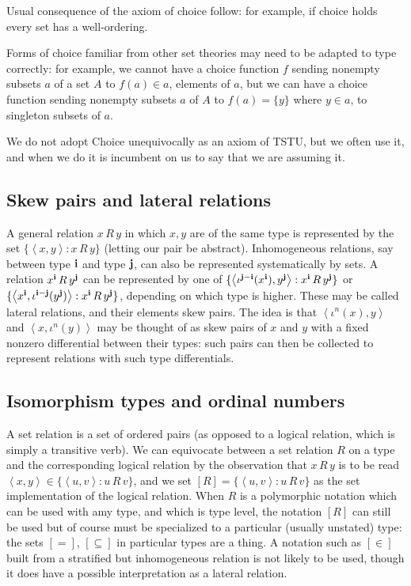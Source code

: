 \documentclass[12pt]{article}
\begin{document}
Usual consequence of the axiom of choice follow:  for example, if choice holds every set has a well-ordering.

Forms of choice familiar from other set theories may need to be adapted to type correctly:  for example, we cannot have a choice function $f$ sending nonempty subsets $a$ of a set $A$ to $f(a) \in a$, elements of $a$, but we can have
a choice function sending nonempty subsets $a$ of $A$ to $f(a) = \{y\}$ where $y \in a$, to singleton subsets of $a$.

We do not adopt Choice unequivocally as an axiom of TSTU, but we often use it, and when we do it is incumbent on us to say that we are assuming it.

\subsection{Skew pairs and lateral relations}

A general relation $x \,R\, y$ in which $x,y$ are of the same type is represented by the set $\{\left<x,y\right>:x \, R\, y\}$ (letting our pair be abstract).  Inhomogeneous relations, say between type ${\bf i}$ and type ${\bf j}$, can also be represented systematically by sets.  A relation $x^{\bf i} \, R \, y^{\bf j}$ can be represented by one of
$\{\left< \iota^{\bf j - i}(x^{\bf i}),y^{\bf j}\right>:x^{\bf  i} \,R\, y^{\bf j}\}$ or $\{\left< x^{\bf i},\iota^{\bf i-j}(y^{\bf j})\right>:x^{\bf  i} \,R\, y^{\bf j}\}$, depending on which type is higher.  These may be called lateral relations, and their elements skew pairs.  The idea is that $\left<\iota^n(x),y\right>$ and $\left<x,\iota^n(y)\right>$ may be thought of as skew pairs of $x$ and $y$ with a fixed nonzero differential between their types:  such pairs can then be collected to represent relations with such type differentials.



\subsection{Isomorphism types and ordinal numbers}

A set relation is a set of ordered pairs (as opposed to a logical relation, which is simply a transitive verb).  We can equivocate between a set relation $R$ on a type and the corresponding logical relation
by the observation that $x \, R\, y$ is to be read $\left<x,y\right> \in \{\left<u,v\right>:u \, R \, v\}$, and we set $[R] = \{\left<u,v\right>:u \, R \, v\}$ as the set implementation of the logical relation.  When $R$ is
a polymorphic notation which can be used with amy type, and which is type level, the notation $[R]$ can still be used but of course must be specialized to a particular (usually unstated) type:  the sets $[=]$, $[\subseteq]$ in particular types are a thing.  A notation such as $[\in]$ built from a stratified but inhomogeneous relation is not likely to be used, though it does have a possible interpretation as a lateral relation.
\end{document}
